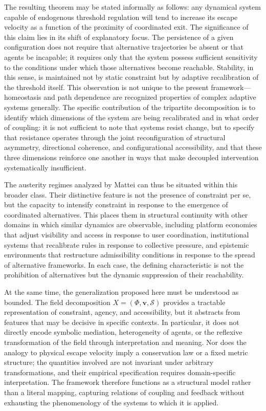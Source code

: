 \documentclass[11pt, a4paper]{article}
\begin{document}
The resulting theorem may be stated informally as follows: any dynamical system capable of endogenous threshold regulation will tend to increase its escape velocity as a function of the proximity of coordinated exit. The significance of this claim lies in its shift of explanatory focus. The persistence of a given configuration does not require that alternative trajectories be absent or that agents be incapable; it requires only that the system possess sufficient sensitivity to the conditions under which those alternatives become reachable. Stability, in this sense, is maintained not by static constraint but by adaptive recalibration of the threshold itself. This observation is not unique to the present framework---homeostasis and path dependence are recognized properties of complex adaptive systems generally. The specific contribution of the tripartite decomposition is to identify which dimensions of the system are being recalibrated and in what order of coupling: it is not sufficient to note that systems resist change, but to specify that resistance operates through the joint reconfiguration of structural asymmetry, directional coherence, and configurational accessibility, and that these three dimensions reinforce one another in ways that make decoupled intervention systematically insufficient.

The austerity regimes analyzed by Mattei \cite{mattei2022,mattei2026} can thus be situated within this broader class. Their distinctive feature is not the presence of constraint per se, but the capacity to intensify constraint in response to the emergence of coordinated alternatives. This places them in structural continuity with other domains in which similar dynamics are observable, including platform economies that adjust visibility and access in response to user coordination, institutional systems that recalibrate rules in response to collective pressure, and epistemic environments that restructure admissibility conditions in response to the spread of alternative frameworks. In each case, the defining characteristic is not the prohibition of alternatives but the dynamic suppression of their reachability.

At the same time, the generalization proposed here must be understood as bounded. The field decomposition $X = (\Phi, \mathbf{v}, \mathcal{S})$ provides a tractable representation of constraint, agency, and accessibility, but it abstracts from features that may be decisive in specific contexts. In particular, it does not directly encode symbolic mediation, heterogeneity of agents, or the reflexive transformation of the field through interpretation and meaning. Nor does the analogy to physical escape velocity imply a conservation law or a fixed metric structure; the quantities involved are not invariant under arbitrary transformations, and their empirical specification requires domain-specific interpretation. The framework therefore functions as a structural model rather than a literal mapping, capturing relations of coupling and feedback without exhausting the phenomenology of the systems to which it is applied.
\end{document}
